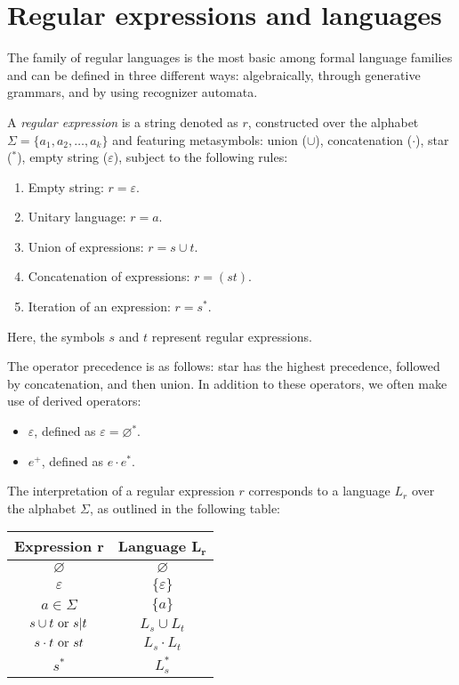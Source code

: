 \section{Regular expressions and languages}

The family of regular languages is the most basic among formal language families and can be defined in three different ways: algebraically, through generative grammars, and by using recognizer automata.
\begin{definition}
    A \emph{regular expression} is a string denoted as $r$, constructed over the alphabet $\Sigma=\{a_1,a_2,\dots,a_k\}$ and featuring metasymbols: union ($\cup$), concatenation ($\cdot$), star ($^{*}$), empty string ($\varepsilon$), subject to the following rules:
    \begin{enumerate}
        \item Empty string: $r=\varepsilon$.
        \item Unitary language: $r=a$.
        \item Union of expressions: $r=s \cup t$.
        \item Concatenation of expressions: $r=(st)$.
        \item Iteration of an expression: $r=s^{*}$. 
    \end{enumerate}
    Here, the symbols $s$ and $t$ represent regular expressions.
\end{definition}
The operator precedence is as follows: star has the highest precedence, followed by concatenation, and then union.
\newpage
In addition to these operators, we often make use of derived operators:
\begin{itemize}
    \item $\varepsilon$, defined as $\varepsilon=\varnothing^{*}$. 
    \item $e^{+}$, defined as $e \cdot e^{*}$. 
\end{itemize}
The interpretation of a regular expression $r$ corresponds to a language $L_r$ over the alphabet $\Sigma$, as outlined in the following table:
\begin{table}[H]
    \centering
    \begin{tabular}{cc}
    \hline
    \textbf{Expression $\boldsymbol{r}$} & \textbf{Language $\boldsymbol{L_r}$} \\ \hline
    $\varnothing$                        & $\varnothing$                        \\
    $\varepsilon$                        & $\{\varepsilon\}$                    \\
    $a \in \Sigma$                       & $\{a\}$                              \\
    $s \cup t \textnormal{ or } s|t$     & $L_s \cup L_t$                       \\
    $s \cdot t \textnormal{ or } st$     & $L_s \cdot L_t$                      \\
    $s^{*}$                              & $L_s^{*}$                            \\ \hline
    \end{tabular}
\end{table}
